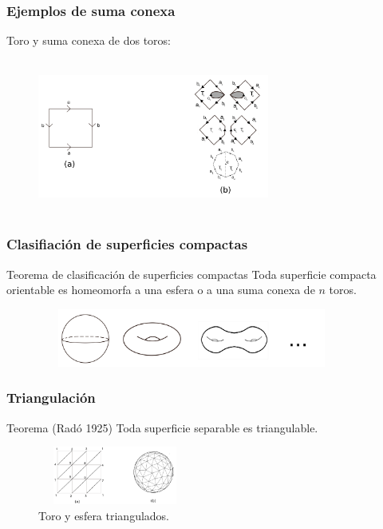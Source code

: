 \documentclass{beamer}
\begin{document}
\begin{frame}
\frametitle{Ejemplos de suma conexa}
Toro y suma conexa de dos toros:
\begin{figure}[htb]
\begin{center}
\includegraphics[width=3in,height=2in]{imagenes/sumaconexa1.png}
\end{center}
\end{figure}
\end{frame}


\begin{frame}
\frametitle{Clasifiación de superficies compactas}
\begin{block}{Teorema de clasificación de superficies compactas}
Toda superficie compacta orientable es homeomorfa a una esfera o a una suma conexa de $n$ toros.
\end{block}

\begin{figure}[htb]
\begin{center}
\includegraphics[width=4in,height=0.75in]{imagenes/diapo4.png} 
\end{center}
\end{figure}
\end{frame}

\begin{frame}
\frametitle{Triangulación}
\begin{block}{Teorema (Radó 1925)}
Toda superficie separable es triangulable.
\end{block}


\begin{figure}[htb]
\begin{center}
\includegraphics[width=2in,height=0.75in]{imagenes/diapo3.png} 
\caption{Toro y esfera triangulados.}
\end{center}
\end{figure}

\end{frame}
\end{document}
